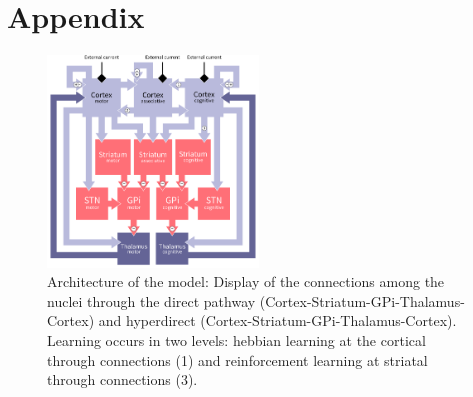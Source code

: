 
\section*{Appendix}

\begin{figure}[h]
  \centering \includegraphics[width=0.5\textwidth]{architecture}
  \caption{Architecture of the model: Display of the connections
  					among the nuclei through the direct pathway
  					(Cortex-Striatum-GPi-Thalamus-Cortex) and
  					hyperdirect (Cortex-Striatum-GPi-Thalamus-Cortex).
  					Learning occurs in two levels: hebbian learning
  					 at the cortical through connections (1) and 
  					 reinforcement learning at striatal through connections 
  					 (3).}
  \label{fig:architecture}
\end{figure}



